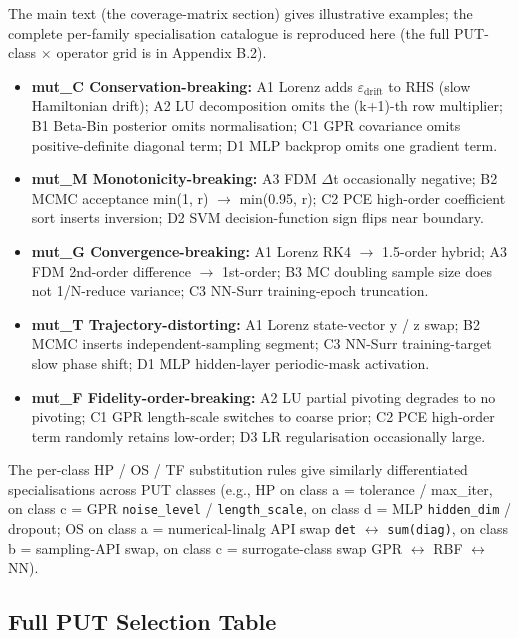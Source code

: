 \documentclass[manuscript,screen,review]{acmart}
\begin{document}
The main text (the coverage-matrix section) gives illustrative
examples; the complete per-family specialisation catalogue is reproduced here
(the full PUT-class $\times$ operator grid is in Appendix B.2).

\begin{itemize}

\item
  \textbf{mut\_C Conservation-breaking:} A1 Lorenz adds $\varepsilon_{\mathrm{drift}}$ to RHS
  (slow Hamiltonian drift); A2 LU decomposition omits the (k+1)-th row
  multiplier; B1 Beta-Bin posterior omits normalisation; C1 GPR
  covariance omits positive-definite diagonal term; D1 MLP backprop
  omits one gradient term.
\item
  \textbf{mut\_M Monotonicity-breaking:} A3 FDM $\Delta$t occasionally
  negative; B2 MCMC acceptance min(1, r) $\to$ min(0.95, r); C2 PCE
  high-order coefficient sort inserts inversion; D2 SVM
  decision-function sign flips near boundary.
\item
  \textbf{mut\_G Convergence-breaking:} A1 Lorenz RK4 $\to$ 1.5-order
  hybrid; A3 FDM 2nd-order difference $\to$ 1st-order; B3 MC doubling sample
  size does not 1/N-reduce variance; C3 NN-Surr training-epoch
  truncation.
\item
  \textbf{mut\_T Trajectory-distorting:} A1 Lorenz state-vector y / z
  swap; B2 MCMC inserts independent-sampling segment; C3 NN-Surr
  training-target slow phase shift; D1 MLP hidden-layer periodic-mask
  activation.
\item
  \textbf{mut\_F Fidelity-order-breaking:} A2 LU partial pivoting
  degrades to no pivoting; C1 GPR length-scale switches to coarse prior;
  C2 PCE high-order term randomly retains low-order; D3 LR
  regularisation occasionally large.
\end{itemize}

The per-class HP / OS / TF substitution rules give similarly differentiated
specialisations across PUT classes (e.g., HP on class a =
tolerance / max\_iter, on class c = GPR \texttt{noise\_level} /
\texttt{length\_scale}, on class d = MLP \texttt{hidden\_dim} / dropout;
OS on class a = numerical-linalg API swap \texttt{det} $\leftrightarrow$
\texttt{sum(diag)}, on class b = sampling-API swap, on class c =
surrogate-class swap GPR $\leftrightarrow$ RBF $\leftrightarrow$ NN).

\subsection{Full PUT Selection Table}\label{k.6-full-put-selection}
\end{document}

